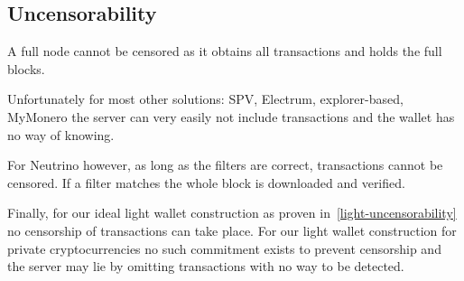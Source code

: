 
\subsection{Uncensorability}
A full node cannot be censored as it obtains all transactions and holds the full blocks.

Unfortunately for most other solutions: SPV, Electrum, explorer-based, MyMonero the server can very easily not include transactions and the wallet has no way of knowing.

For Neutrino however, as long as the filters are correct, transactions cannot be censored. If a filter matches the whole block is downloaded and verified.

Finally, for our ideal light wallet construction as proven in~\cref{light-uncensorability} no censorship of transactions can take place.
For our light wallet construction for private cryptocurrencies no such commitment exists to prevent censorship and the server may lie by omitting transactions with no way to be detected.
